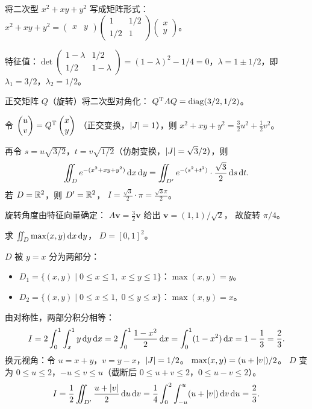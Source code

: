 \documentclass{ctexart}
\begin{document}
\begin{solution}
  将二次型 $x^2+xy+y^2$ 写成矩阵形式：
  $x^2+xy+y^2 = \begin{pmatrix} x & y \end{pmatrix}
  \begin{pmatrix} 1 & 1/2 \\ 1/2 & 1 \end{pmatrix}
  \begin{pmatrix} x \\ y \end{pmatrix}$。

  特征值：$\det\begin{pmatrix} 1-\lambda & 1/2 \\ 1/2 & 1-\lambda \end{pmatrix}
  = (1-\lambda)^2 - 1/4 = 0$，$\lambda = 1 \pm 1/2$，即 $\lambda_1 = 3/2$，$\lambda_2 = 1/2$。

  正交矩阵 $Q$（旋转）将二次型对角化：
  $Q^{\mathrm{T}} A Q = \mathrm{diag}(3/2, 1/2)$。

  令 $\begin{pmatrix} u \\ v \end{pmatrix} = Q^{\mathrm{T}} \begin{pmatrix} x \\ y \end{pmatrix}$
  （正交变换，$\left| J \right| = 1$），则
  $x^2+xy+y^2 = \frac{3}{2}u^2 + \frac{1}{2}v^2$。

  再令 $s = u\sqrt{3/2}$，$t = v\sqrt{1/2}$（仿射变换，$\left| J \right| = \sqrt{3}/2$），则
  \[
    \iint_D e^{-(x^2+xy+y^2)}\,\mathrm{d} x\,\mathrm{d} y
    = \iint_{D'} e^{-(s^2+t^2)}\cdot\frac{\sqrt{3}}{2}\,\mathrm{d} s\,\mathrm{d} t.
  \]
  若 $D = \mathbb{R}^2$，则 $D' = \mathbb{R}^2$，
  $I = \frac{\sqrt{3}}{2}\cdot\pi = \frac{\sqrt{3}\pi}{2}$。

  旋转角度由特征向量确定：
  $A\mathbf{v} = \frac{3}{2}\mathbf{v}$ 给出 $\mathbf{v} = (1,1)/\sqrt{2}$，
  故旋转 $\pi/4$。
\end{solution}

\begin{exercise}
  求 $\iint_D \max(x,y)\,\mathrm{d} x\,\mathrm{d} y$，
  $D = [0,1]^2$。
\end{exercise}

\begin{solution}
  $D$ 被 $y = x$ 分为两部分：
  \begin{itemize}
    \item $D_1 = \{(x,y) \mid 0 \le x \le 1,\; x \le y \le 1\}$：$\max(x,y) = y$。
    \item $D_2 = \{(x,y) \mid 0 \le x \le 1,\; 0 \le y \le x\}$：$\max(x,y) = x$。
  \end{itemize}
  由对称性，两部分积分相等：
  \[
    I = 2\int_0^1\int_x^1 y\,\mathrm{d} y\,\mathrm{d} x
    = 2\int_0^1 \frac{1-x^2}{2}\,\mathrm{d} x
    = \int_0^1(1-x^2)\,\mathrm{d} x
    = 1 - \frac{1}{3} = \frac{2}{3}.
  \]
  换元视角：令 $u = x+y$，$v = y-x$，$\left| J \right| = 1/2$。
  $\max(x,y) = (u+\left| v \right|)/2$。
  $D$ 变为 $0 \le u \le 2$，$-u \le v \le u$（截断后 $0 \le u+v \le 2$，$0 \le u-v \le 2$）。
  \[
    I = \frac{1}{2}\iint_{D'} \frac{u+\left| v \right|}{2}\,\mathrm{d} u\,\mathrm{d} v
    = \frac{1}{4}\int_0^2\int_{-u}^{u}(u+\left| v \right|)\,\mathrm{d} v\,\mathrm{d} u = \frac{2}{3}.
  \]
\end{solution}
\end{document}
